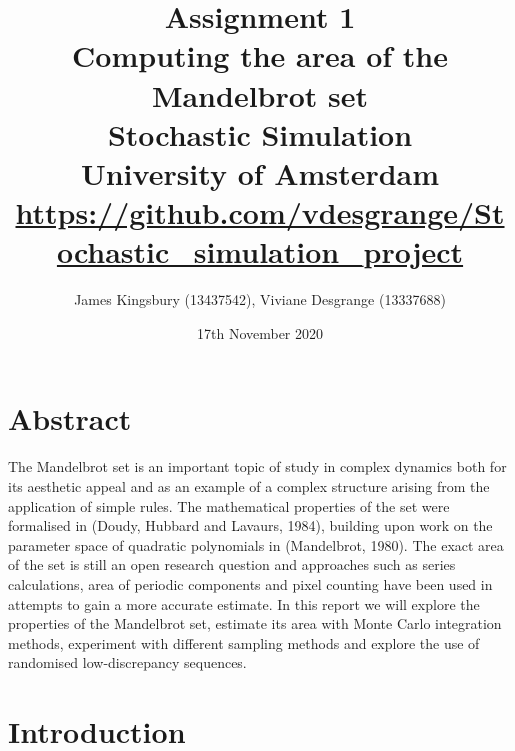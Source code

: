 \documentclass{article}
\title{Assignment 1 \\ Computing the area of the Mandelbrot set \\ \large Stochastic Simulation \\University of Amsterdam\\
\href{https://github.com/vdesgrange/Stochastic_simulation_project}{https://github.com/vdesgrange/Stochastic\_simulation\_project}}
\author{James Kingsbury (13437542), Viviane Desgrange (13337688) }
\date{17th November 2020}
\begin{document}
    \begin{titlingpage}
        \maketitle
    \end{titlingpage}


    \section*{Abstract}

    The Mandelbrot set is an important topic of study in complex dynamics both for its aesthetic appeal and as an example of a complex structure arising from the application of simple rules. The mathematical properties of the set were formalised in (Doudy, Hubbard and Lavaurs, 1984), building upon work on the parameter space of quadratic polynomials in (Mandelbrot, 1980). The exact area of the set is still an open research question and approaches such as series calculations, area of periodic components and pixel counting have been used in attempts to gain a more accurate estimate. In this report we will explore the properties of the Mandelbrot set, estimate its area with Monte Carlo integration methods, experiment with different sampling methods and explore the use of randomised low-discrepancy sequences.

    \section*{Introduction}
\end{document}
